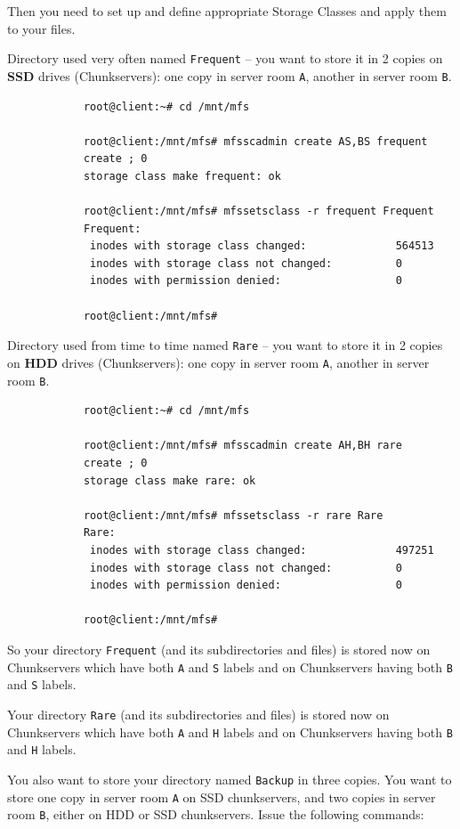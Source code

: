 \documentclass[a4paper,11pt,english]{report}
\def\code#1{\texttt{#1}}
\begin{document}
			Then you need to set up and define appropriate Storage Classes and apply them to your files.
	
			Directory used very often named \code{Frequent} -- you want to store it in 2 copies on \textbf{SSD} drives (Chunkservers): one copy in server room \code{A}, another in server room \code{B}.
	
			\begin{lstlisting}
			root@client:~# cd /mnt/mfs
			
			root@client:/mnt/mfs# mfsscadmin create AS,BS frequent
			create ; 0
			storage class make frequent: ok
			
			root@client:/mnt/mfs# mfssetsclass -r frequent Frequent
			Frequent:
			 inodes with storage class changed:              564513
			 inodes with storage class not changed:          0
			 inodes with permission denied:                  0
			 
			root@client:/mnt/mfs#
			\end{lstlisting}
			
			Directory used from time to time named \code{Rare} -- you want to store it in 2 copies on \textbf{HDD} drives (Chunkservers): one copy in server room \code{A}, another in server room \code{B}.
			
			\begin{lstlisting}
			root@client:~# cd /mnt/mfs
			
			root@client:/mnt/mfs# mfsscadmin create AH,BH rare
			create ; 0
			storage class make rare: ok
			
			root@client:/mnt/mfs# mfssetsclass -r rare Rare
			Rare:
			 inodes with storage class changed:              497251
			 inodes with storage class not changed:          0
			 inodes with permission denied:                  0
			 
			root@client:/mnt/mfs#
			\end{lstlisting}
			
			
			So your directory \code{Frequent} (and its subdirectories and files) is stored now on Chunkservers which have both \code{A} and \code{S} labels and on Chunkservers having both \code{B} and \code{S} labels.
			
			Your directory \code{Rare} (and its subdirectories and files) is stored now on Chunkservers which have both \code{A} and \code{H} labels and on Chunkservers having both \code{B} and \code{H} labels.
			
			You also want to store your directory named \code{Backup} in three copies. You want to store one copy in server room \code{A} on SSD chunkservers, and two copies in server room \code{B}, either on HDD or SSD chunkservers. Issue the following commands:
			
\end{document}

